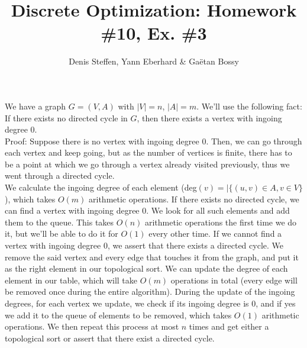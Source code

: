 \documentclass[a4paper,11pt,french]{article}
\title{Discrete Optimization: Homework \#10, Ex. \#3}
\author{Denis Steffen, Yann Eberhard \& Gaëtan Bossy}
\begin{document}
    
    \maketitle
We have a graph $G=(V,A)$ with $|V|=n$, $|A|=m$.
We'll use the following fact: If there exists no directed cycle in $G$, then there exists a vertex with ingoing degree 0. \\
Proof: Suppose there is no vertex with ingoing degree 0. Then, we can go through each vertex and keep going, but as the number of vertices is finite, there has to be a point at which we go through a vertex already visited previously, thus we went through a directed cycle. \\

We calculate the ingoing degree of each element (deg$(v)=|\{(u,v)\in A,v\in V\}$), which takes $O(m)$ arithmetic operations. If there exists no directed cycle, we can find a vertex with ingoing degree 0. We look for all such elements and add them to the queue. This takes $O(n)$ arithmetic operations the first time we do it, but we'll be able to do it for $O(1)$ every other time. If we cannot find a vertex with ingoing degree 0, we assert that there exists a directed cycle. We remove the said vertex and every edge that touches it from the graph, and put it as the right element in our topological sort. We can update the degree of each element in our table, which will take $O(m)$ operations in total (every edge will be removed once during the entire algorithm). During the update of the ingoing degrees, for each vertex we update, we check if its ingoing degree is 0, and if yes we add it to the queue of elements to be removed, which takes $O(1)$ arithmetic operations. We then repeat this process at most $n$ times and get either a topological sort or assert that there exist a directed cycle.
\end{document}
